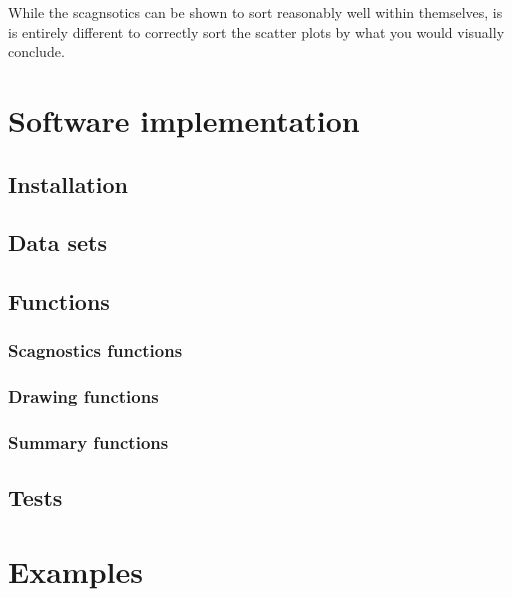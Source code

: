While the scagnsotics can be shown to sort reasonably well within
themselves, is is entirely different to correctly sort the scatter plots
by what you would visually conclude.

\hypertarget{software-implementation}{%
\section{Software implementation}\label{software-implementation}}

\hypertarget{installation}{%
\subsection{Installation}\label{installation}}

\hypertarget{data-sets}{%
\subsection{Data sets}\label{data-sets}}

\hypertarget{functions}{%
\subsection{Functions}\label{functions}}

\hypertarget{scagnostics-functions}{%
\subsubsection{Scagnostics functions}\label{scagnostics-functions}}

\hypertarget{drawing-functions}{%
\subsubsection{Drawing functions}\label{drawing-functions}}

\hypertarget{summary-functions}{%
\subsubsection{Summary functions}\label{summary-functions}}

\hypertarget{tests}{%
\subsection{Tests}\label{tests}}

\hypertarget{examples}{%
\section{Examples}\label{examples}}

